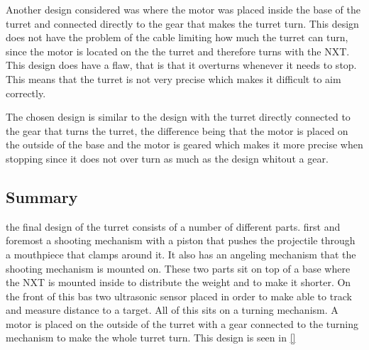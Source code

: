 Another design considered was where the motor was placed inside the base of the
turret and connected directly to the gear that makes the turret turn. This
design does not have the problem of the cable limiting how much the turret can
turn, since the motor is located on the the turret and therefore turns with the
NXT. This design does have a flaw, that is that it overturns whenever it needs
to stop. This means that the turret is not very precise which makes it difficult to
aim correctly.\nl

The chosen design is similar to the design with the turret directly connected to
the gear that turns the turret, the difference being that the motor is placed on
the outside of the base and the motor is geared which makes it more precise when
stopping since it does not over turn as much as the design whitout a gear. 

\subsection{Summary}
the final design of the turret consists of a number of different parts. first
and foremost a shooting mechanism with a piston that pushes the projectile
through a mouthpiece that clamps around it. It also has an angeling mechanism
that the shooting mechanism is mounted on. These two parts sit on top of a
base where the NXT is mounted inside to distribute the weight and to make it
shorter. On the front of this bas two ultrasonic sensor placed in order to make
\name able to track and measure distance to a target. All of this sits on a
turning mechanism. A motor is placed on the outside of the
turret with a gear connected to the turning mechanism to make the whole turret
turn. This design is seen in \autoref{}
